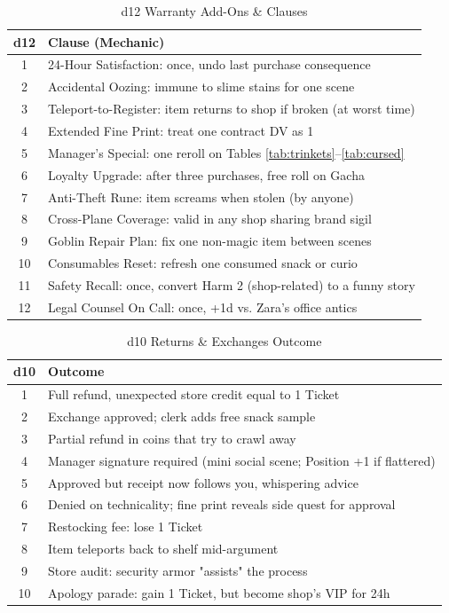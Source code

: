\begin{table}[h]
\centering
\caption{d12 Warranty Add-Ons \& Clauses}
\label{tab:warranty}
\begin{tabular}{@{}cl@{}}
\toprule
d12 & Clause (Mechanic) \\
\midrule
1 & 24-Hour Satisfaction: once, undo last purchase consequence \\
2 & Accidental Oozing: immune to slime stains for one scene \\
3 & Teleport-to-Register: item returns to shop if broken (at worst time) \\
4 & Extended Fine Print: treat one contract DV as 1 \\
5 & Manager's Special: one reroll on Tables \ref{tab:trinkets}--\ref{tab:cursed} \\
6 & Loyalty Upgrade: after three purchases, free roll on Gacha \\
7 & Anti-Theft Rune: item screams when stolen (by anyone) \\
8 & Cross-Plane Coverage: valid in any shop sharing brand sigil \\
9 & Goblin Repair Plan: fix one non-magic item between scenes \\
10 & Consumables Reset: refresh one consumed snack or curio \\
11 & Safety Recall: once, convert Harm 2 (shop-related) to a funny story \\
12 & Legal Counsel On Call: once, +1d vs. Zara's office antics \\
\bottomrule
\end{tabular}
\end{table}

\begin{table}[h]
\centering
\caption{d10 Returns \& Exchanges Outcome}
\label{tab:returns}
\begin{tabular}{@{}cl@{}}
\toprule
d10 & Outcome \\
\midrule
1 & Full refund, unexpected store credit equal to 1 Ticket \\
2 & Exchange approved; clerk adds free snack sample \\
3 & Partial refund in coins that try to crawl away \\
4 & Manager signature required (mini social scene; Position +1 if flattered) \\
5 & Approved but receipt now follows you, whispering advice \\
6 & Denied on technicality; fine print reveals side quest for approval \\
7 & Restocking fee: lose 1 Ticket \\
8 & Item teleports back to shelf mid-argument \\
9 & Store audit: security armor "assists" the process \\
10 & Apology parade: gain 1 Ticket, but become shop's VIP for 24h \\
\bottomrule
\end{tabular}
\end{table}

